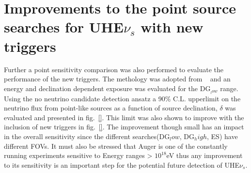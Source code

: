 \section*{Improvements to the point source searches for UHE$\nu_s$ with new triggers}
Further a point sensitivity comparison was also performed to evaluate the performance of the new triggers. The methology was adopted from ~\cite{} and an energy and declination dependent exposure was evaluated for the DG$_{_low}$ range. Using the no neutrino candidate detection ansatz a 90\% C.L. upperlimit on the neutrino flux from point-like sources as a function of source declination, $\delta$ was evaluated and presented in fig.~\ref{}. This limit was also shown to improve with the inclusion of new triggers in fig.~\ref{}. The improvement though small has an impact in the overall sensitivity since the different searches(DG$_low$, DG$_high$, ES) have different FOVs. It must also be stressed that Auger is one of the constantly running experiments sensitive to Energy ranges > $10^{18}$eV thus any improvement to its sensitivity is an important step for the potential future detection of UHE$\nu_s$. 



